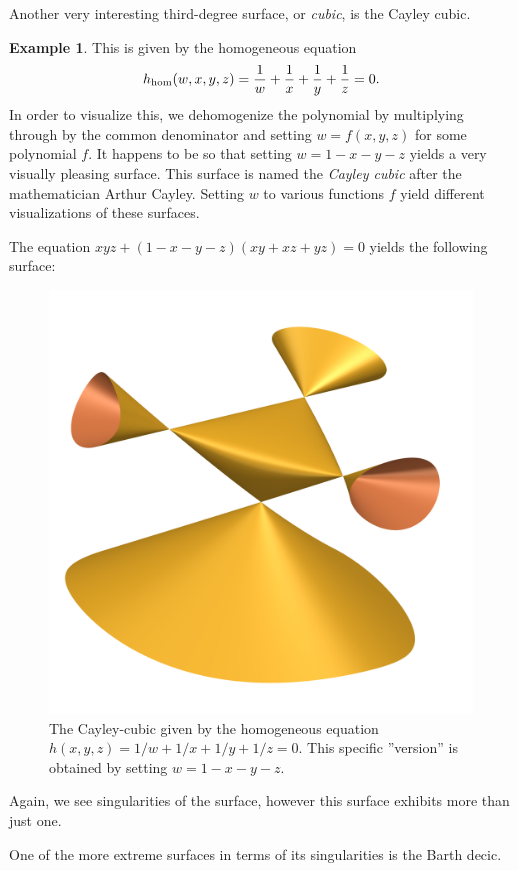 \documentclass[a4paper]{article}
\theoremstyle{definition}
\newtheorem{exmpl}{Example}
\theoremstyle{plain}
\renewcommand{\hom}{\ensuremath{h_{\mathrm{hom}}}}
\begin{document}
    Another very interesting third-degree surface, or \emph{cubic}, is the
    Cayley cubic. 
    \begin{exmpl}
        This is given by the homogeneous equation
        \begin{equation}
            \notag
            \hom(w, x, y, z) = \frac{1}{w} + \frac{1}{x} + \frac{1}{y} + \frac{1}{z} = 0.
        \end{equation}
        In order to visualize this, we dehomogenize the polynomial by
        multiplying through by the common denominator and setting $w = f(x, y,
        z)$ for some polynomial $f$. It happens to be so that setting $w = 1 - x
        - y - z$ yields a very visually pleasing surface. This surface is named
        the \emph{Cayley cubic} after the mathematician Arthur Cayley.  Setting
        $w$ to various functions $f$ yield different visualizations of these
        surfaces.
        
        The equation $xyz + (1 - x - y - z)(xy + xz + yz) = 0$ yields the
        following surface:
        \begin{figure}[]
            \centering
            \includegraphics[width=0.3\linewidth]{../pictures/cayley_cubic.png}
            \caption{The Cayley-cubic given by the homogeneous equation $h(x,
                y, z) = 1/w + 1 /x + 1 / y + 1/z = 0$.  This specific ''version''
                is obtained by setting $w = 1 - x - y - z$.}
            \label{fig:}
        \end{figure}
        Again, we see singularities of the surface, however this surface
        exhibits more than just one. 
    \end{exmpl}
    One of the more extreme surfaces in terms of its singularities is the Barth
    decic.
\end{document}
